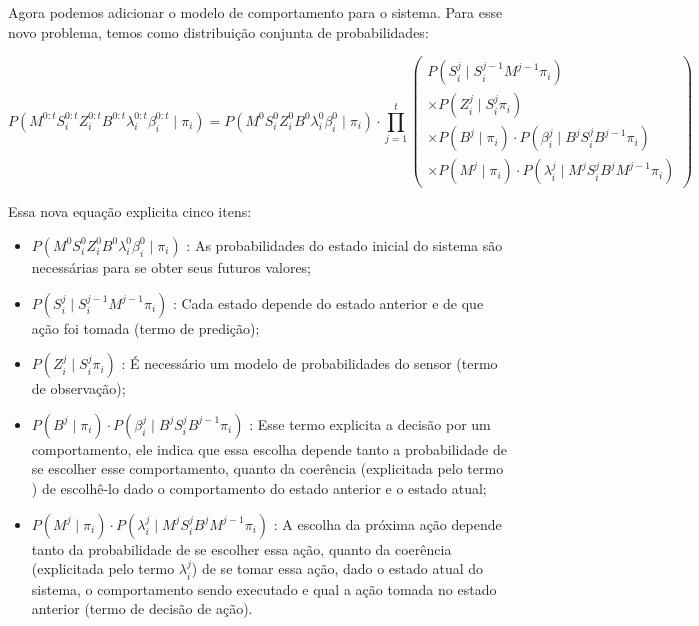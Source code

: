 Agora podemos adicionar o modelo de comportamento para o sistema. Para esse novo problema, temos como distribuição conjunta de probabilidades: 

\begin{equation}
    P \left( M^{0: t} S_i^{0: t} Z_i^{0: t} B^{0: t} \lambda_i^{0: t} \beta_i^{0: t} \mid \pi_i \right) = P \left( M^0 S_i^0 Z_i^0 B^0 \lambda_i^0 \beta_i^0 \mid \pi_i \right) \cdot \prod\limits_{j =1}^{t} 
        \left(
            \begin{array}{l}
                P \left( S_i^j \mid S_i^{j -1} M^{j-1} \pi_i \right) \\
                \times P \left( Z_i^j \mid S_i^j \pi_i \right) \\
                \times P \left( B^j \mid \pi_i \right) \cdot P \left( \beta_i^j \mid B^j S_i^j B^{j-1} \pi_i \right) \\
                \times P \left( M^j \mid \pi_i \right) \cdot P \left( \lambda_i^j \mid M^j S_i^j B^j M^{j-1} \pi_i \right)
            \end{array}
        \right)
\end{equation}

Essa nova equação explicita cinco itens:


\begin{itemize}
    \item $ P \left( M^0 S_i^0 Z_i^0 B^0 \lambda_i^0 \beta_i^0 \mid \pi_i \right) $ : As probabilidades do estado inicial do sistema são necessárias para se obter seus futuros valores;
    \item $ P \left( S_i^j \mid S_i^{j-1} M^{j-1} \pi_i \right) $ : Cada estado depende do estado anterior e de que ação foi tomada (termo de predição);
    \item $ P \left( Z_i^j \mid S_i^j \pi_i \right) $ : É necessário um modelo de probabilidades do sensor (termo de observação);
    \item $ P \left( B^j \mid \pi_i \right) \cdot P \left( \beta_i^j \mid B^j S_i^j B^{j-1} \pi_i \right) $ : Esse termo explicita a decisão por um comportamento, ele indica que essa escolha depende tanto a probabilidade de se escolher esse comportamento, quanto da coerência (explicitada pelo termo ) de escolhê-lo dado o comportamento do estado anterior e o estado atual;
    \item $ P \left( M^j \mid \pi_i \right) \cdot P \left( \lambda_i^j \mid M^j S_i^j B^j M^{j-1} \pi_i \right) $ : A escolha da próxima ação depende tanto da probabilidade de se escolher essa ação, quanto da coerência (explicitada pelo termo $ \lambda_i^j $) de se tomar essa ação, dado o estado atual do sistema, o comportamento sendo executado e qual a ação tomada no estado anterior (termo de decisão de ação).
\end{itemize}

